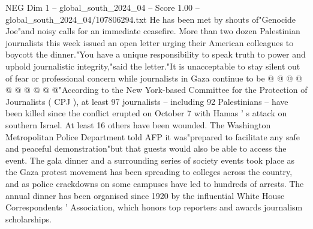 \begin{textsample}{NEG Dim 1 – global\_south\_2024\_04 – Score 1.00 – global\_south\_2024\_04/107806294.txt}
He has been met by shouts of"Genocide Joe"and noisy calls for an immediate ceasefire.
More than two dozen Palestinian journalists this week issued an open letter urging their American colleagues to boycott the dinner."You have a unique responsibility to speak truth to power and uphold journalistic integrity,"said the letter."It is unacceptable to stay silent out of fear or professional concern while journalists in Gaza continue to be @ @ @ @ @ @ @ @ @ @"According to the New York-based Committee for the Protection of Journalists ( CPJ ), at least 97 journalists -- including 92 Palestinians -- have been killed since the conflict erupted on October 7 with Hamas ' s attack on southern Israel.
At least 16 others have been wounded.
The Washington Metropolitan Police Department told AFP it was"prepared to facilitate any safe and peaceful demonstration"but that guests would also be able to access the event.
The gala dinner and a surrounding series of society events took place as the Gaza protest movement has been spreading to colleges across the country, and as police crackdowns on some campuses have led to hundreds of arrests.
The annual dinner has been organised since 1920 by the influential White House Correspondents ' Association, which honors top reporters and awards journalism scholarships.

\end{textsample}
